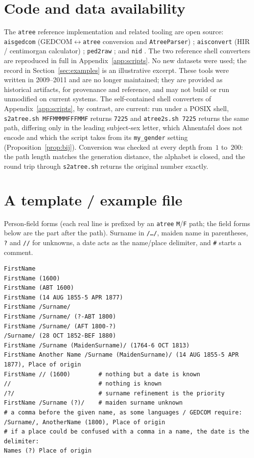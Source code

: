\documentclass[11pt]{article}
\newcommand{\atree}{\texttt{atree}}
\begin{document}
\section*{Code and data availability}
The \atree{} reference implementation and related tooling are open source: \texttt{aisgedcom}
(GEDCOM$\leftrightarrow$\atree{} conversion and \texttt{AtreeParser}) \cite{aisgedcom};
\texttt{aisconvert} (HIR / centimorgan calculator) \cite{aisconvert}; \texttt{ped2raw}
\cite{ped2raw}; and \texttt{nid} \cite{nid}. The two reference shell converters are reproduced in
full in Appendix~\ref{app:scripts}. No new datasets were used; the record in
Section~\ref{sec:examples} is an illustrative excerpt.
These tools were written in 2009--2011 and are no longer maintained; they are provided as historical
artifacts, for provenance and reference, and may not build or run unmodified on current systems. The
self-contained shell converters of Appendix~\ref{app:scripts}, by contrast, are current: run under a
POSIX shell, \texttt{s2atree.sh MFFMMMMFFFMMF} returns \texttt{7225} and \texttt{atree2s.sh 7225}
returns the same path, differing only in the leading subject-sex letter, which Ahnentafel does not
encode and which the script takes from its \texttt{my\_gender} setting (Proposition~\ref{prop:bij}).
Conversion was checked at every depth from~$1$ to~$200$: the path length matches the generation
distance, the alphabet is closed, and the round trip through \texttt{s2atree.sh} returns the original
number exactly.

\appendix

\section{A template / example file}
\label{app:template}
Person-field forms (each real line is prefixed by an \atree{} \texttt{M}/\texttt{F} path; the field
forms below are the part after the path). Surname in \texttt{/\dots/}, maiden name in parentheses,
\texttt{?} and \texttt{//} for unknowns, a date acts as the name/place delimiter, and \texttt{\#}
starts a comment.

\begin{verbatim}
FirstName
FirstName (1600)
FirstName (ABT 1600)
FirstName (14 AUG 1855-5 APR 1877)
FirstName /Surname/
FirstName /Surname/ (?-ABT 1800)
FirstName /Surname/ (AFT 1800-?)
/Surname/ (28 OCT 1852-BEF 1880)
FirstName /Surname (MaidenSurname)/ (1764-6 OCT 1813)
FirstName Another Name /Surname (MaidenSurname)/ (14 AUG 1855-5 APR 1877), Place of origin
FirstName // (1600)        # nothing but a date is known
//                         # nothing is known
/?/                        # surname refinement is the priority
FirstName /Surname (?)/    # maiden surname unknown
# a comma before the given name, as some languages / GEDCOM require:
/Surname/, AnotherName (1800), Place of origin
# if a place could be confused with a comma in a name, the date is the delimiter:
Names (?) Place of origin
\end{verbatim}
\end{document}
